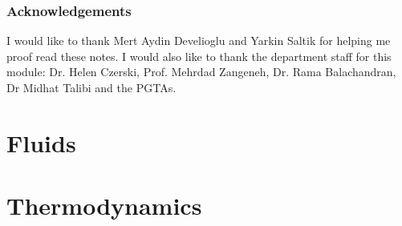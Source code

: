 \documentclass{hdnotes}
\begin{document}
\section*{Acknowledgements}
I would like to thank Mert Aydin Develioglu and Yarkin Saltik for helping me proof read these notes. I would also like to thank the department staff for this module: Dr. Helen Czerski, Prof. Mehrdad Zangeneh, Dr. Rama Balachandran, Dr Midhat Talibi and the PGTAs. \thispagestyle{plain}
\part{Fluids}






\part{Thermodynamics}





\end{document}

